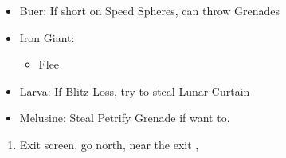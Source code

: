 \begin{encounters}
  \begin{itemize}
    \item Buer: If short on Speed Spheres, can throw Grenades
    \item Iron Giant:
          \begin{itemize}
            \switch{\tidus}{\rikku}
            \rikkuf Steal Light Curtain
            \switch{\wakka}{\tidus}
            \tidusf Defend
            \enemyf Attacks \rikku
            \auronf Defend
            \item Flee 
          \end{itemize}
    \item Larva: If Blitz Loss, try to steal Lunar Curtain
    \item Melusine: Steal Petrify Grenade if want to.
  \end{itemize}
\end{encounters}
\begin{enumerate}[resume]
  \item Exit screen, go north, near the exit \sd, \cs[3:10]
\end{enumerate}